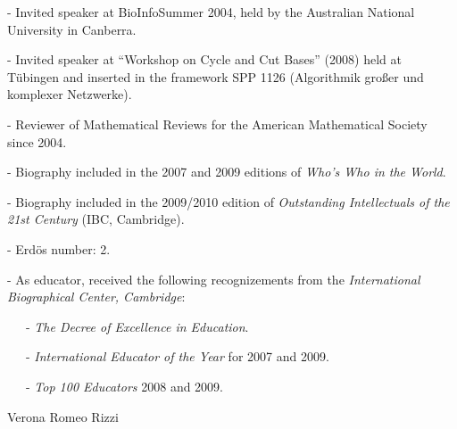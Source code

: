 \documentclass[10pt]{article}
\begin{document}
   - Invited speaker at BioInfoSummer 2004,
     held by the Australian National University in Canberra.

   - Invited speaker at
     ``Workshop on Cycle and Cut Bases'' (2008)
     held at T\"ubingen and inserted in the framework
     SPP 1126 (Algorithmik großer und komplexer Netzwerke).

   - Reviewer of Mathematical Reviews for the American Mathematical Society
     since 2004.

   - Biography included in the 2007 and 2009
     editions of \emph{Who's Who in the World}.

   - Biography included in the 2009/2010 edition
     of \emph{Outstanding Intellectuals of the 21st Century} (IBC, Cambridge).

   - Erd\"os number: 2.

   - As educator, received the following recognizements
     from the \emph{International Biographical Center, Cambridge}:

   \ \ \ - \emph{The Decree of Excellence in Education}.

   \ \ \ - \emph{International Educator of the Year} for 2007 and 2009.

   \ \ \ - \emph{Top 100 Educators} 2008 and 2009.


\vspace{1.2cm}
Verona \hspace{7.8cm} Romeo Rizzi
\end{document}

